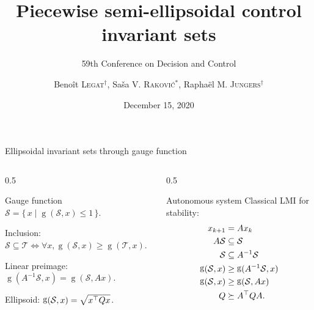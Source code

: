 \documentclass[9pt,notes=hide]{beamer}
\title{Piecewise semi-ellipsoidal control invariant sets}
\subtitle{59th Conference on Decision and Control}
\date{December 15, 2020}
\author{Beno\^{i}t \textsc{Legat}$^\dagger$, Sa\v{s}a V. \textsc{Rakovi\'c}$^*$, Rapha\"el M. \textsc{Jungers}$^\dagger$}
\institute{${}^\dagger$ UCLouvain, Belgium, ${}^*$ Beijing Institute of Technology, China}
\DeclareMathOperator{\gauge}{g}
\begin{document}
\begin{frame}%
  \maketitle
\end{frame}

\begin{frame}{Ellipsoidal invariant sets through gauge function}
  \begin{columns}
    \begin{column}{0.5\textwidth}
      \begin{block}{\alert{Gauge} function}
        $\mathcal{S} = \{\, x \mid \gauge(\mathcal{S}, x) \le 1 \,\}$.

        Inclusion: $\mathcal{S} \subseteq \mathcal{T} \Leftrightarrow \forall x, \gauge(\mathcal{S}, x) \ge \gauge(\mathcal{T}, x)$.

        Linear \alert{preimage}: $\gauge(A^{-1}\mathcal{S}, x) = \gauge(\mathcal{S}, Ax)$.

        \alert{Ellipsoid}: $\gauge(\mathcal{S}, x) = \sqrt{x^\Tr Q x}$.
      \end{block}
    \end{column}
    \begin{column}{0.5\textwidth}
      \begin{block}{Autonomous system}
        Classical LMI for stability:
        \begin{align*}
          x_{k+1} & = Ax_k\\
          A\mathcal{S} & \subseteq \mathcal{S}\\
          \mathcal{S} & \subseteq A^{-1}\mathcal{S}\\
          \gauge(\mathcal{S}, x) & \ge \gauge(A^{-1}\mathcal{S}, x)\\
          \gauge(\mathcal{S}, x) & \ge \gauge(\mathcal{S}, Ax)\\
          Q & \succeq A^\Tr Q A.
        \end{align*}
      \end{block}
    \end{column}
  \end{columns}
\end{frame}
\end{document}
